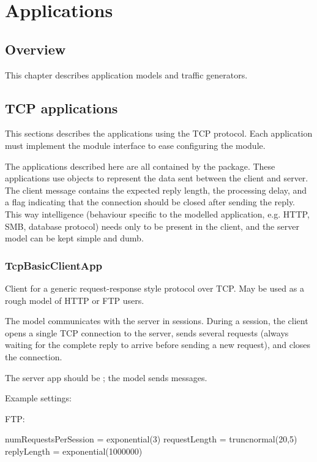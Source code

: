 \chapter{Applications}
\label{cha:apps}


\section{Overview}

This chapter describes application models and traffic generators.

\section{TCP applications}

This sections describes the applications using the TCP protocol.
Each application must implement the  module interface
to ease configuring the  module.

The applications described here are all contained by the
 package. These applications use
 objects to represent the data sent between the client
and server. The client message contains the expected reply length, the
processing delay, and a flag indicating that the connection should be closed
after sending the reply. This way intelligence (behaviour specific to the
modelled application, e.g. HTTP, SMB, database protocol) needs only to be
present in the client, and the server model can be kept simple and dumb.


\subsection{TcpBasicClientApp}

Client for a generic request-response style protocol over TCP.
May be used as a rough model of HTTP or FTP users.

The model communicates with the server in sessions. During a session,
the client opens a single TCP connection to the server, sends several
requests (always waiting for the complete reply to arrive before
sending a new request), and closes the connection.

The server app should be ; the model sends
 messages.

Example settings:

FTP:

\begin{inifile}
numRequestsPerSession = exponential(3)
requestLength = truncnormal(20,5)
replyLength = exponential(1000000)
\end{inifile}

